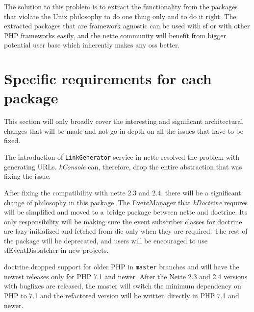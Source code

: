The solution to this problem is to extract the functionality from the packages that violate the Unix philosophy to do one thing only and to do it right. The extracted packages that are framework agnostic can be used with \gls{sf} or with other PHP frameworks easily, and the \gls{nette} community will benefit from bigger potential user base which inherently makes any \gls{oss} better.

\section{Specific requirements for each package} \label{sec:roadmap:each-package}

This section will only broadly cover the interesting and significant architectural changes that will be made and not go in depth on all the issues that have to be fixed.


The introduction of \lstinline{LinkGenerator} service in \gls{nette} resolved the problem with generating URLs. \textit{\gls{kConsole}} can, therefore, drop the entire abstraction that was fixing the issue.


After fixing the compatibility with \gls{nette} 2.3 and 2.4, there will be a significant change of philosophy in this package. The EventManager that \textit{\gls{kDoctrine}} requires will be simplified and moved to a bridge package between \gls{nette} and \gls{doctrine}. Its only responsibility will be making sure the event subscriber classes for \gls{doctrine} are lazy-initialized and fetched from \gls{dic} only when they are required. The rest of the package will be deprecated, and users will be encouraged to use \gls{sfEventDispatcher} in new projects.




\gls{doctrine} dropped support for older PHP in \lstinline{master} branches and will have the newest releases only for PHP 7.1 and newer. After the Nette 2.3 and 2.4 versions with bugfixes are released, the master will switch the minimum dependency on PHP to 7.1 and the refactored version will be written directly in PHP 7.1 and newer.

